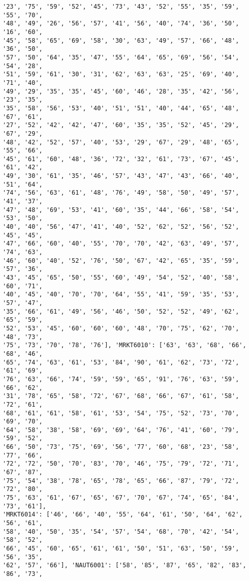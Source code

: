 \documentclass[11pt]{article}
\begin{document}
\begin{Verbatim}[commandchars=\\\{\}]
'23', '75', '59', '52', '45', '73', '43', '52', '55', '35', '59', '55', '70',
'48', '49', '26', '56', '57', '41', '56', '40', '74', '36', '50', '16', '60',
'45', '58', '65', '69', '58', '30', '63', '49', '57', '66', '48', '36', '50',
'57', '50', '64', '35', '47', '55', '64', '65', '69', '56', '54', '54', '28',
'51', '59', '61', '30', '31', '62', '63', '63', '25', '69', '40', '71', '40',
'49', '29', '35', '35', '45', '60', '46', '28', '35', '42', '56', '23', '35',
'35', '58', '56', '53', '40', '51', '51', '40', '44', '65', '48', '67', '61',
'27', '52', '42', '42', '47', '60', '35', '35', '52', '45', '29', '67', '29',
'48', '42', '52', '57', '40', '53', '29', '67', '29', '48', '65', '55', '66',
'45', '61', '60', '48', '36', '72', '32', '61', '73', '67', '45', '61', '42',
'49', '30', '61', '35', '46', '57', '43', '47', '43', '66', '40', '51', '64',
'74', '56', '63', '61', '48', '76', '49', '58', '50', '49', '57', '41', '37',
'47', '48', '69', '53', '41', '60', '35', '44', '66', '58', '54', '53', '50',
'40', '40', '56', '47', '41', '40', '52', '62', '52', '56', '52', '45', '45',
'47', '66', '60', '40', '55', '70', '70', '42', '63', '49', '57', '74', '63',
'46', '60', '40', '52', '76', '50', '67', '42', '65', '35', '59', '57', '36',
'43', '45', '65', '50', '55', '60', '49', '54', '52', '40', '58', '60', '71',
'40', '45', '40', '70', '70', '64', '55', '41', '59', '35', '53', '57', '47',
'35', '66', '61', '49', '56', '46', '50', '52', '52', '49', '62', '65', '59',
'52', '53', '45', '60', '60', '60', '48', '70', '75', '62', '70', '48', '73',
'75', '73', '70', '78', '76'], 'MRKT6010': ['63', '63', '68', '66', '68', '46',
'65', '74', '63', '61', '53', '84', '90', '61', '62', '73', '72', '61', '69',
'76', '63', '66', '74', '59', '59', '65', '91', '76', '63', '59', '66', '62',
'31', '78', '65', '58', '72', '67', '68', '66', '67', '61', '58', '72', '61',
'68', '61', '61', '58', '61', '53', '54', '75', '52', '73', '70', '69', '70',
'64', '58', '38', '58', '69', '69', '64', '76', '41', '60', '79', '59', '52',
'66', '50', '73', '75', '69', '56', '77', '60', '68', '23', '58', '77', '66',
'72', '72', '50', '70', '83', '70', '46', '75', '79', '72', '71', '67', '87',
'75', '54', '38', '78', '65', '78', '65', '66', '87', '79', '72', '72', '80',
'75', '63', '61', '67', '65', '67', '70', '67', '74', '65', '84', '73', '61'],
'MRKT6014': ['46', '66', '40', '55', '64', '61', '50', '64', '62', '56', '61',
'58', '40', '50', '35', '54', '57', '54', '68', '70', '42', '54', '58', '52',
'66', '45', '60', '65', '61', '61', '50', '51', '63', '50', '59', '56', '35',
'62', '57', '66'], 'NAUT6001': ['58', '85', '87', '65', '82', '83', '86', '73',

\end{Verbatim}
\end{document}
